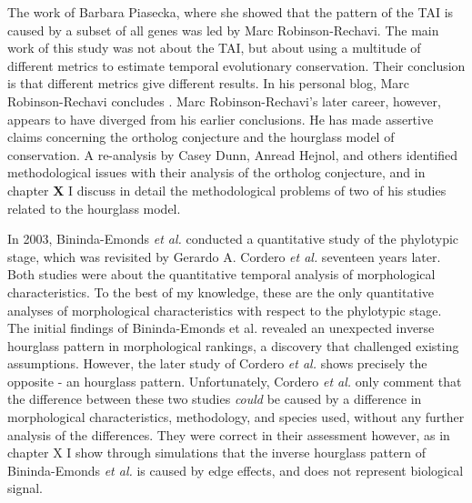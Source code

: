 The work of Barbara Piasecka, where she showed that the pattern of the TAI is caused by a subset of all genes was led by Marc Robinson-Rechavi. The main work of this study was not about the TAI, but about using a multitude of different metrics to estimate temporal evolutionary conservation. Their conclusion is that different metrics give different results. In his personal blog, Marc Robinson-Rechavi concludes \cite{robinsonrechaviblog}. Marc Robinson-Rechavi's later career, however, appears to have diverged from his earlier conclusions. He has made assertive claims concerning the ortholog conjecture\cite{KryuchkovaMostacci2016} and the hourglass model of conservation\cite{Liu2020,Liu2021,marletaz2018}. A re-analysis by Casey Dunn, Anread Hejnol, and others identified methodological issues with their analysis of the ortholog conjecture\cite{Dunn2018}, and in chapter \textbf{X} I discuss in detail the methodological problems of two of his studies related to the hourglass model.

In 2003, Bininda-Emonds \textit{et al.} conducted a quantitative study of the phylotypic stage, which was revisited by Gerardo A. Cordero \textit{et al.} seventeen years later\cite{OlafRP2003, Cordero2020}. Both studies were about the quantitative temporal analysis of morphological characteristics. To the best of my knowledge, these are the only quantitative analyses of morphological characteristics with respect to the phylotypic stage. The initial findings of Bininda-Emonds et al. revealed an unexpected inverse hourglass pattern in morphological rankings, a discovery that challenged existing assumptions. However, the later study of Cordero \textit{et al.} shows precisely the opposite - an hourglass pattern. Unfortunately, Cordero \textit{et al.} only comment that the difference between these two studies \textit{could} be caused by a difference in morphological characteristics, methodology, and species used, without any further analysis of the differences. They were correct in their assessment however, as in chapter X I show through simulations that the inverse hourglass pattern of Bininda-Emonds \textit{et al.} is caused by edge effects, and does not represent biological signal.

